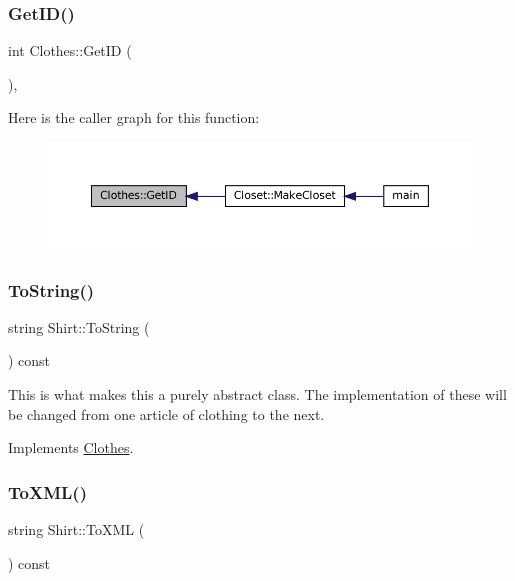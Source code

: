 \subsubsection{\texorpdfstring{Get\+I\+D()}{GetID()}}
{\footnotesize\ttfamily int Clothes\+::\+Get\+ID (\begin{DoxyParamCaption}{ }\end{DoxyParamCaption})\hspace{0.3cm}{\ttfamily [inline]}, {\ttfamily [inherited]}}

Here is the caller graph for this function\+:\nopagebreak
\begin{figure}[H]
\begin{center}
\leavevmode
\includegraphics[width=350pt]{classClothes_a3f6dac172f333126d19010f85ec44e4c_icgraph}
\end{center}
\end{figure}
\mbox{\label{classShirt_ab85aaa20a603d63f4144d1b42d9b616d}} 
\subsubsection{\texorpdfstring{To\+String()}{ToString()}}
{\footnotesize\ttfamily string Shirt\+::\+To\+String (\begin{DoxyParamCaption}{ }\end{DoxyParamCaption}) const\hspace{0.3cm}{\ttfamily [virtual]}}

This is what makes this a purely abstract class. The implementation of these will be changed from one article of clothing to the next. 

Implements \mbox{\hyperlink{classClothes_a953d143394e9a2c007ab0c3a638973cf}{Clothes}}.

\mbox{\label{classShirt_ae636e58135bd1ca4ac590e55e8d47cac}} 
\subsubsection{\texorpdfstring{To\+X\+M\+L()}{ToXML()}}
{\footnotesize\ttfamily string Shirt\+::\+To\+X\+ML (\begin{DoxyParamCaption}{ }\end{DoxyParamCaption}) const}



